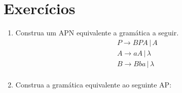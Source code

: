 \documentclass[a4paper]{article}
\theoremstyle{definition}
\begin{document}
  \section{Exercícios} 

  \begin{enumerate}
     \item Construa um APN equivalente a gramática a seguir.
       \[
         \begin{array}{l}
           P \to BPA \,|\,A \\
           A \to aA \,|\, \lambda\\
           B \to Bba \,|\,\lambda\\
         \end{array}
       \]
     \item Construa a gramática equivalente ao seguinte AP:
    \begin{figure}[H]
      \centering
    \end{figure}
  \end{enumerate}
\end{document}
